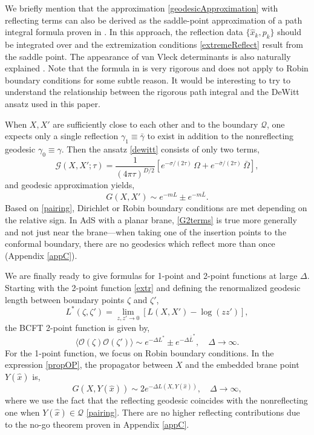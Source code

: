 \documentclass[reprint,amsmath,amssymb,aps,nofootinbib,twocolumn]{revtex4-2}
\begin{document}
We briefly mention that the approximation \eqref{geodesicApproximation} with reflecting terms can also be derived as the saddle-point approximation of a path integral formula proven in \cite{Ludewig_2017}. In this approach, the reflection data $ \{\hat{x}_k,p_k\} $ should be integrated over and the extremization conditions \eqref{extremeReflect} result from the saddle point. The appearance of van Vleck determinants is also naturally explained \cite{zannias_path-integral_1983}. Note that the formula in \cite{Ludewig_2017} is very rigorous and does not apply to Robin boundary conditions for some subtle reason. It would be interesting to try to understand the relationship between the rigorous path integral and the DeWitt ansatz used in this paper.

When $ X,X' $ are sufficiently close to each other and to the boundary $ \mathcal{Q} $, one expects only a single reflection $ \gamma_1 \equiv \bar{\gamma} $ to exist in addition to the nonreflecting geodesic $ \gamma_0 \equiv \gamma $. Then the ansatz \eqref{dewitt} consists of only two terms,
\begin{equation}
\mathcal{G}(X,X';\tau) = \frac{1}{(4\pi\tau)^{D\slash 2}} \left[e^{-\sigma\slash (2\tau)}\,\Omega +e^{-\bar{\sigma}\slash (2\tau)}\,\bar{\Omega}\right],
\end{equation}
and geodesic approximation yields,
\begin{equation}
G(X,X') \sim e^{-mL}\pm e^{-m\bar{L}}.
\label{G2terms}
\end{equation}
Based on \eqref{pairing}, Dirichlet or Robin boundary conditions are met depending on the relative sign. In AdS with a planar brane, \eqref{G2terms} is true more generally and not just near the brane---when taking one of the insertion points to the conformal boundary, there are no geodesics which reflect more than once (Appendix \ref{appC}).

We are finally ready to give formulas for 1-point and 2-point functions at large $ \Delta $. Starting with the 2-point function \eqref{extr} and defining the renormalized geodesic length between boundary points $\zeta$ and $\zeta'$,
\begin{equation}
L^*(\zeta,\zeta') = \lim_{z,z'\rightarrow 0}[L(X,X') - \log{(zz')}],
\end{equation}
the BCFT 2-point function is given by,
\begin{equation}
\langle \mathcal{O}(\zeta)\mathcal{O}(\zeta') \rangle \sim e^{-\Delta L^*}\pm e^{-\Delta \bar{L}^*}, \quad \Delta\rightarrow \infty.
\end{equation}
For the 1-point function, we focus on Robin boundary conditions. In the expression \eqref{propOP}, the propagator between $X$ and the embedded brane point $Y(\hat{x})$ is,
\begin{equation}
G(X,Y(\hat{x})) \sim 2e^{-\Delta L(X,Y(\hat{x}))}, \quad \Delta \rightarrow \infty,
\end{equation}
where we use the fact that the reflecting geodesic coincides with the nonreflecting one when $ Y(\hat{x}) \in \mathcal{Q} $ \eqref{pairing}. There are no higher reflecting contributions due to the no-go theorem proven in Appendix \ref{appC}.
\end{document}

